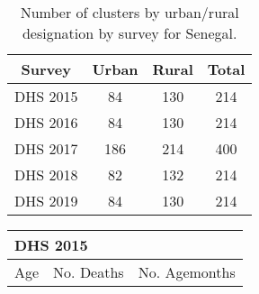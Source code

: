 \documentclass[
]{article}
\begin{document}
\begin{table}[ht]
\centering
\begin{tabular}{cccc}
  \hline
Survey & Urban & Rural & Total \\ 
  \hline
DHS 2015 & 84 & 130 & 214 \\ 
  DHS 2016 & 84 & 130 & 214 \\ 
  DHS 2017 & 186 & 214 & 400 \\ 
  DHS 2018 & 82 & 132 & 214 \\ 
  DHS 2019 & 84 & 130 & 214 \\ 
   \hline
\end{tabular}
\caption{Number of clusters by urban/rural designation by survey for Senegal.} 
\end{table}
\begin{table}[!ht]
\centering
\begin{tabular}{ccc}
   
\multicolumn{3}{l}{DHS 2015}\\ 
\hline
Age & No. Deaths & No. Agemonths \\\hline


\end{tabular}
\end{table}
\end{document}
